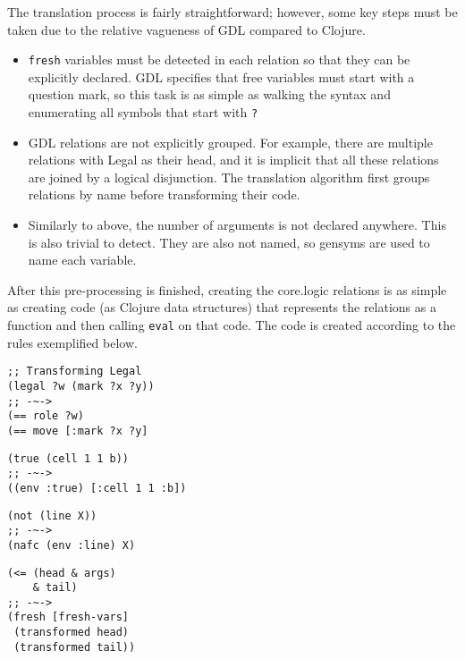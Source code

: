 \documentclass[letterpaper]{article}
\begin{document}
The translation process is fairly straightforward; however, some key steps must be taken due to the relative vagueness of GDL compared to Clojure.
\begin{itemize}
\item \texttt{fresh} variables must be detected in each relation so that they can be explicitly declared. GDL specifies that free variables must start with a question mark, so this task is as simple as walking the syntax and enumerating all symbols that start with \texttt{?}
\item GDL relations are not explicitly grouped. For example, there are multiple relations with Legal as their head, and it is implicit that all these relations are joined by a logical disjunction. The translation algorithm first groups relations by name before transforming their code.
\item Similarly to above, the number of arguments is not declared anywhere. This is also trivial to detect. They are also not named, so gensyms are used to name each variable.
\end{itemize}

After this pre-processing is finished, creating the core.logic relations is as simple as creating code (as Clojure data structures) that represents the relations as a function and then calling \texttt{eval} on that code. The code is created according to the rules exemplified below.
\begin{lstlisting}[frame=single, caption=Reflexive head calls turn into unifications]
;; Transforming Legal
(legal ?w (mark ?x ?y))
;; -~->
(== role ?w)
(== move [:mark ?x ?y]
\end{lstlisting}

\begin{lstlisting}[frame=single,caption=All other relations reference the environment]
(true (cell 1 1 b))
;; -~->
((env :true) [:cell 1 1 :b])
\end{lstlisting}

\begin{lstlisting}[frame=single,caption=not turns into negation as failure constraint (nafc)]
(not (line X))
;; -~->
(nafc (env :line) X)
\end{lstlisting}

\begin{lstlisting}[frame=single,caption={\textless= relations are joined in a fresh block}]
(<= (head & args)
    & tail)
;; -~->
(fresh [fresh-vars]
 (transformed head)
 (transformed tail))
\end{lstlisting}
\end{document}
